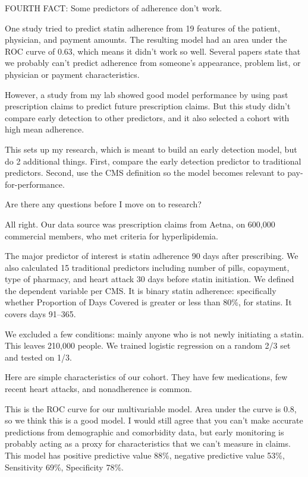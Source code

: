 \documentclass[12pt]{report}
\begin{document}
\begin{large}
FOURTH FACT: Some predictors of adherence don't work. %

One study tried to predict statin adherence from 19 features of the
patient, physician, and payment amounts. The resulting model had an
area under the ROC curve of 0.63, which means it didn't work so well.
Several papers state that we probably can't predict adherence from
someone's appearance, problem list, or physician or payment
characteristics. %

However, a study from my lab showed good model performance by using
past prescription claims to predict future prescription claims. But
this study didn't compare early detection to other predictors, and it
also selected a cohort with high mean adherence. %

This sets up my research, which is meant to build an early detection
model, but do 2 additional things. First, compare the early detection
predictor to traditional predictors. Second, use the CMS definition so
the model becomes relevant to pay-for-performance.

Are there any questions before I move on to research?







All right. Our data source was prescription claims from Aetna, on
600,000 commercial members, who met criteria for hyperlipidemia. %

The major predictor of interest is statin adherence 90 days after
prescribing. We also calculated 15 traditional predictors including
number of pills, copayment, type of pharmacy, and heart attack 30 days
before statin initiation. We defined the dependent variable per CMS.
It is binary statin adherence: specifically whether Proportion of Days
Covered is greater or less than 80\%, for statins. It covers days
91--365. %

We excluded a few conditions: mainly anyone who is not newly
initiating a statin. This leaves 210,000 people. We trained logistic
regression on a random 2/3 set and tested on 1/3. %

Here are simple characteristics of our cohort. They have few
medications, few recent heart attacks, and nonadherence is common.

This is the ROC curve for our multivariable model. Area under the
curve is 0.8, so we think this is a good model. I would still agree
that you can't make accurate predictions from demographic and
comorbidity data, but early monitoring is probably acting as a proxy
for characteristics that we can't measure in claims. This model has
positive predictive value 88\%, negative predictive value 53\%,
Sensitivity 69\%, Specificity 78\%. %


\end{large}
\end{document}
